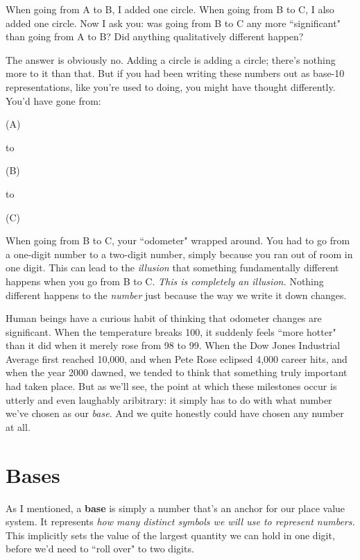When going from A to B, I added one circle. When going from B to C, I also
added one circle. Now I ask you: was going from B to C any more
``significant" than going from A to B? Did anything qualitatively different
happen? 

The answer is obviously no. Adding a circle is adding a circle; there's
nothing more to it than that. But if you had been writing these numbers out
as base-10 representations, like you're used to doing, you might have
thought differently. You'd have gone from:
\begin{center}
{\large (A)} \quad\quad \raisebox{-.6mm}{\LARGE 8}
\end{center}
to
\begin{center}
{\large (B)} \quad\quad \raisebox{-.6mm}{\LARGE 9}
\end{center}
to
\begin{center}
{\large (C)} \quad\quad \raisebox{-.6mm}{\LARGE 10}
\end{center}
When going from B to C, your ``odometer" wrapped around. You had to go from
a one-digit number to a two-digit number, simply because you ran out of
room in one digit. This can lead to the \textit{illusion} that something
fundamentally different happens when you go from B to C. \textit{This is
completely an illusion.} Nothing different happens to the \textit{number}
just because the way we write it down changes.

Human beings have a curious habit of thinking that odometer changes are
significant. When the temperature breaks 100, it suddenly feels ``more
hotter" than it did when it merely rose from 98 to 99. When the Dow Jones
Industrial Average first reached 10,000, and when Pete Rose eclipsed 4,000
career hits, and when the year 2000 dawned, we tended to think that
something truly important had taken place. But as we'll see, the point at
which these milestones occur is utterly and even laughably aribitrary: it
simply has to do with what number we've chosen as our \textit{base}. And we
quite honestly could have chosen any number at all.

\section{Bases}

As I mentioned, a \textbf{base} is simply a number that's an anchor for our
place value system. It represents \textit{how many distinct symbols we
will use to represent numbers.} This implicitly sets the value of the
largest quantity we can hold in one digit, before we'd need to ``roll over"
to two digits.

